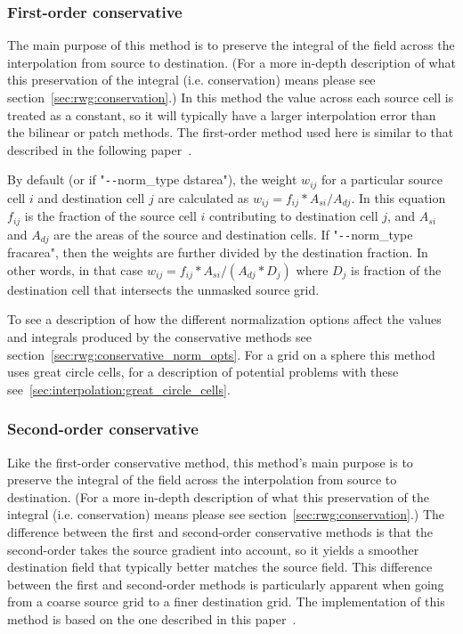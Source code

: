 \subsubsection{First-order conservative}\label{sec:rwg_conserve}
 The main purpose of this method is to preserve the integral of the field across the interpolation from source to destination.  
 (For a more in-depth description of what this preservation of the integral (i.e. conservation) means please see section~\ref{sec:rwg:conservation}.)  In this method the value across each source cell is treated as a constant, so it will typically have a larger 
 interpolation error than the bilinear or patch methods.  The first-order method used here is similar to that described in the following paper~\cite{ConservativeOrder1}.

 By default (or if "\verb+--+norm\_type dstarea"), the weight $w_{ij}$ for a particular source cell $i$ and destination cell $j$ are calculated as $w_{ij}=f_{ij} * A_{si}/A_{dj}$. 
In this equation $f_{ij}$ is the fraction of the source cell $i$ contributing to destination cell $j$, and $A_{si}$ and $A_{dj}$ are the areas of the source and 
destination cells. If "\verb+--+norm\_type fracarea", then the weights are further divided by the destination fraction. In other words, in that case $w_{ij}=f_{ij} * A_{si}/(A_{dj}*D_j)$ where $D_j$ is fraction of the destination cell that intersects the unmasked source grid. 

To see a description of how the different normalization options affect the values and integrals produced by the conservative methods see section~\ref{sec:rwg:conservative_norm_opts}. For a grid on a sphere this method uses great circle cells, for a description of potential problems with these see~\ref{sec:interpolation:great_circle_cells}.

\subsubsection{Second-order conservative}\label{sec:rwg_conserve2d}
 Like the first-order conservative method, this method's main purpose is to preserve the integral of the field across the interpolation from source to destination.  
 (For a more in-depth description of what this preservation of the integral (i.e. conservation) means please see section~\ref{sec:rwg:conservation}.)  The difference between the first and second-order conservative methods is that the second-order takes the source gradient into account, so
 it yields a smoother destination field that typically better matches the source field. This difference between the first and second-order methods 
 is particularly apparent when going from a coarse source grid to a finer destination grid. The implementation of this method is based on the one described in this paper~\cite{ConservativeOrder2}.

